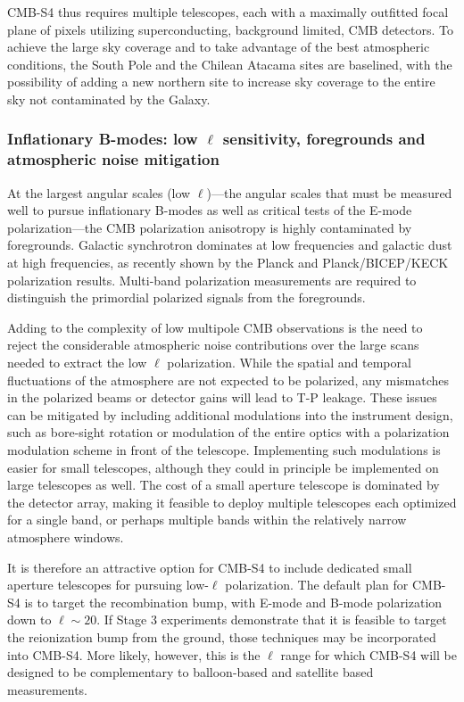 CMB-S4 thus requires multiple telescopes, each with a maximally outfitted focal plane of pixels utilizing superconducting, background limited, CMB detectors. To achieve the large sky coverage and to take advantage of the best atmospheric conditions, the South Pole and the Chilean Atacama sites are baselined, with the possibility of adding a new northern site to increase sky coverage to the entire sky not contaminated by the Galaxy.

\subsubsection{Inflationary B-modes: low $\ell$ sensitivity, foregrounds and atmospheric noise mitigation}

At the largest angular scales (low $\ell$)---the angular scales that must be measured well to pursue inflationary B-modes as well as critical tests of the E-mode polarization---the CMB polarization anisotropy is highly contaminated by foregrounds. Galactic synchrotron dominates at low frequencies and galactic dust at high frequencies, as recently shown by the Planck and Planck/BICEP/KECK polarization results. Multi-band polarization measurements are required to distinguish the primordial polarized signals from the foregrounds. 

Adding to the complexity of low multipole CMB observations is the need to reject the considerable atmospheric noise contributions over the large scans needed to extract the low 
$\ell$ polarization. While the spatial and temporal fluctuations of the atmosphere are not expected to be polarized, any mismatches in the polarized beams or detector gains will lead to T-P leakage. These issues can be mitigated by including additional modulations into the instrument design, such as bore-sight rotation or modulation of the entire optics with a polarization modulation scheme in front of the telescope. Implementing such modulations is easier for small telescopes, although they could in principle be implemented on large telescopes as well. The cost of a small aperture telescope is dominated by the detector array, making it feasible to deploy multiple telescopes each optimized for a single band, or perhaps multiple bands within the relatively narrow atmosphere windows.

It is therefore an attractive option for CMB-S4 to include dedicated small aperture telescopes for pursuing low-$\ell$ polarization. The default plan for CMB-S4 is to target the recombination bump, with E-mode and B-mode polarization down to $\ell \sim 20$. If Stage 3 experiments demonstrate that it is feasible to target the reionization bump from the ground, those techniques may be incorporated into CMB-S4. More likely, however, this is the $\ell$ range for which CMB-S4 will be designed to be complementary to balloon-based and satellite based measurements. 

